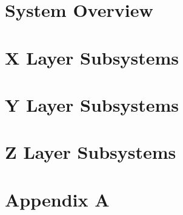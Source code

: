 \documentclass[11pt,letterpaper]{article}
\begin{document}
\section{System Overview}

\newpage
%
\newpage
\section{X Layer Subsystems}

\newpage
\section{Y Layer Subsystems}

\newpage
\section{Z Layer Subsystems}

\newpage
\section{Appendix A}

\newpage



{}
\end{document}

